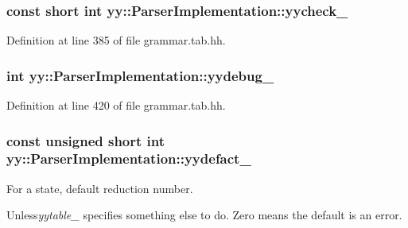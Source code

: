 \hypertarget{classyy_1_1_parser_implementation_a4e24c627ad1d965e70a148cd5506dc39}{
\subsubsection[{yycheck\_\-}]{\setlength{\rightskip}{0pt plus 5cm}const short int {\bf yy::ParserImplementation::yycheck\_\-}}}
\label{classyy_1_1_parser_implementation_a4e24c627ad1d965e70a148cd5506dc39}


Definition at line 385 of file grammar.tab.hh.

\hypertarget{classyy_1_1_parser_implementation_a425e4a850d551cc72a476db0af50b7af}{
\subsubsection[{yydebug\_\-}]{\setlength{\rightskip}{0pt plus 5cm}int {\bf yy::ParserImplementation::yydebug\_\-}}}
\label{classyy_1_1_parser_implementation_a425e4a850d551cc72a476db0af50b7af}


Definition at line 420 of file grammar.tab.hh.

\hypertarget{classyy_1_1_parser_implementation_a81c137fe508047a1ceebf394fc175495}{
\subsubsection[{yydefact\_\-}]{\setlength{\rightskip}{0pt plus 5cm}const unsigned short int {\bf yy::ParserImplementation::yydefact\_\-}}}
\label{classyy_1_1_parser_implementation_a81c137fe508047a1ceebf394fc175495}


For a state, default reduction number. 

Unless{\itshape yytable\_\-\/} specifies something else to do. Zero means the default is an error. 

